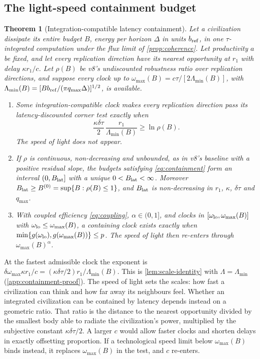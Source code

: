 \documentclass[11pt,a4paper]{article}
\newtheorem{theorem}[proposition]{Theorem}
\theoremstyle{definition}
\newcommand{\Blat}{B_{\rm lat}}
\newcommand{\Lmin}{\Lambda_{\min}}
\begin{document}
\subsection{The light-speed containment budget}
\begin{theorem}[Integration-compatible latency containment]
\label{thm:containment}
Let a civilization dissipate its entire budget $B$, energy per horizon
$\Delta$ in units $b_{\rm ref}$, in one $\tau$-integrated computation under the
flux limit of \cref{prop:coherence}. Let productivity $a$ be fixed, and let
every replication direction have its nearest opportunity at $r_1$ with delay
$\kappa r_1/c$. Let $\rho(B)$ be v8's undiscounted robustness ratio over
replication directions, and suppose every clock up to
$\omega_{\max}(B)=c\tau/[2\Lmin(B)]$, with
$\Lmin(B)=[Bb_{\rm ref}/(\pi q_{\max}\Delta)]^{1/2}$, is available.
\begin{enumerate}[label=(\roman*),leftmargin=*,nosep]
\item Some integration-compatible clock makes every replication direction pass
its latency-discounted corner test exactly when
\begin{equation}
 \frac{\kappa\delta\tau}{2}\,\frac{r_1}{\Lmin(B)}\geq\ln\rho(B).
 \label{eq:containment}
\end{equation}
The speed of light does not appear.
\item If $\rho$ is continuous, non-decreasing and unbounded, as in v8's baseline
with a positive residual slope, the budgets satisfying \cref{eq:containment} form
an interval $(0,\Blat]$ with a unique $0<\Blat<\infty$. Moreover
$\Blat\geq B^{(0)}=\sup\{B:\rho(B)\leq1\}$, and $\Blat$ is non-decreasing in
$r_1$, $\kappa$, $\delta\tau$ and $q_{\max}$.
\item With coupled efficiency \cref{eq:coupling}, $\alpha\in(0,1]$, and clocks in
$[\omega_{\rm lo},\omega_{\max}(B)]$ with $\omega_{\rm lo}\leq\omega_{\max}(B)$, a
containing clock exists exactly when
$\min\{g(\omega_{\rm lo}),g(\omega_{\max}(B))\}\leq p$. The speed of light then
re-enters through $\omega_{\max}(B)^\alpha$.
\end{enumerate}
\end{theorem}
\noindent At the fastest admissible clock the exponent is
$\delta\omega_{\max}\kappa r_1/c=(\kappa\delta\tau/2)r_1/\Lmin(B)$. This is
\cref{lem:scale-identity} with $\Lambda=\Lmin$ (\cref{app:containment-proof}).
The speed of light sets the scales: how fast a civilization can think and how
far away its neighbours feel. Whether an integrated civilization can be
contained by latency depends instead on a geometric ratio. That ratio is the
distance to the nearest opportunity divided by the smallest body able to
radiate the civilization's power, multiplied by the subjective constant
$\kappa\delta\tau/2$. A larger $c$ would allow faster clocks and shorten
delays in exactly offsetting proportion. If a technological speed limit below
$\omega_{\max}(B)$ binds instead, it replaces $\omega_{\max}(B)$ in the test,
and $c$ re-enters.
\end{document}
